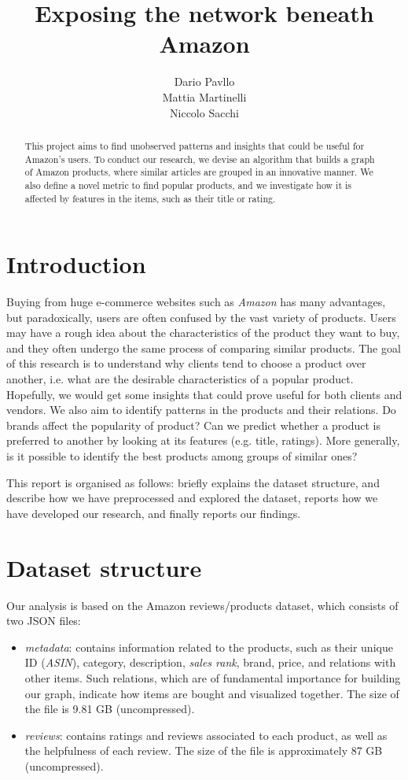 \documentclass[11pt]{article}
\title{Exposing the network beneath Amazon}
\author{Dario Pavllo  \\\And
  Mattia Martinelli  \\\And
Niccolo Sacchi \\}
\date{}
\begin{document}
\maketitle
\begin{abstract}
This project aims to find unobserved patterns and insights that could be useful for Amazon's users. To conduct our research, we devise an algorithm that builds a graph of Amazon products, where similar articles are grouped in an innovative manner. We also define a novel metric to find popular products, and we investigate how it is affected by features in the items, such as their title or rating.
\end{abstract}

\section{Introduction}
Buying from huge e-commerce websites such as \emph{Amazon} has many advantages, but paradoxically, users are often confused by the vast variety of products. Users may have a rough idea about the characteristics of the product they want to buy, and they often undergo the same process of comparing similar products. The goal of this research is to understand why clients tend to choose a product over another, i.e. what are the desirable characteristics of a popular product. Hopefully, we would get some insights that could prove useful for both clients and vendors.
We also aim to identify patterns in the products and their relations. Do brands affect the popularity of product? Can we predict whether a product is preferred to another by looking at its features (e.g. title, ratings). More generally, is it possible to identify the best products among groups of similar ones? 

This report is organised as follows:  briefly explains the dataset structure,  and  describe how we have preprocessed and explored the dataset,  reports how we have developed our research, and finally  reports our findings.

\section{Dataset structure}
\label{sec:datastruct}
Our analysis is based on the Amazon reviews/products dataset, which consists of two JSON files: 
\begin{itemize}
	\item \textit{metadata}: contains information related to the products, such as their unique ID (\textit{ASIN}), category, description, \textit{sales rank}, brand, price, and relations with other items. Such relations, which are of fundamental importance for building our graph, indicate how items are bought and visualized together. The size of the file is 9.81 GB (uncompressed).
	\item \textit{reviews}: contains ratings and reviews associated to each product, as well as the helpfulness of each review. The size of the file is approximately 87 GB (uncompressed).
\end{itemize}
\end{document}
